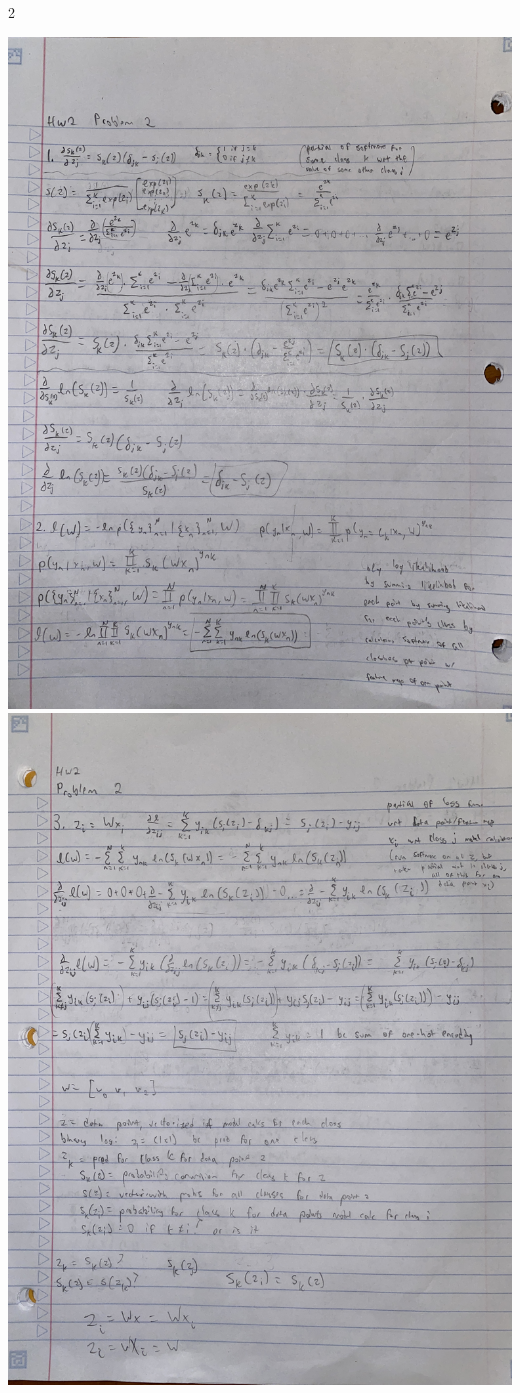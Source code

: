 \documentclass[submit]{harvardml}
\begin{document}
\newpage
\begin{sol}{}{2}
  \begin{center}
    \includegraphics[angle=270,width=0.9\linewidth]{images/Problem_2_1_2.JPG}\\
    \includegraphics[angle=270,width=0.9\linewidth]{images/Problem_2_3.JPG}\\

\end{center}
\end{sol}
\end{document}
